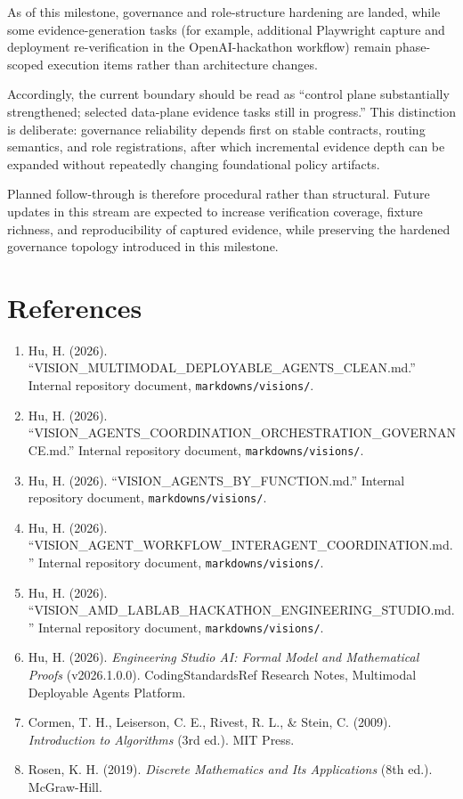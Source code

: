 \documentclass[12pt]{article}
\begin{document}
As of this milestone, governance and role-structure hardening are landed,
while some evidence-generation tasks (for example, additional Playwright
capture and deployment re-verification in the OpenAI-hackathon workflow)
remain phase-scoped execution items rather than architecture changes.

Accordingly, the current boundary should be read as ``control plane
substantially strengthened; selected data-plane evidence tasks still in
progress.'' This distinction is deliberate: governance reliability
depends first on stable contracts, routing semantics, and role
registrations, after which incremental evidence depth can be expanded
without repeatedly changing foundational policy artifacts.

Planned follow-through is therefore procedural rather than structural.
Future updates in this stream are expected to increase verification
coverage, fixture richness, and reproducibility of captured evidence,
while preserving the hardened governance topology introduced in this
milestone.

\newpage
\section*{References}
\label{sec:references}

\begin{sloppypar}
\begin{enumerate}
    \item Hu, H. (2026). ``VISION\_MULTIMODAL\_\allowbreak DEPLOYABLE\_AGENTS\_CLEAN.md.''
          Internal repository document, \texttt{markdowns/visions/}.
    \item Hu, H. (2026). ``VISION\_AGENTS\_COORDINATION\_\allowbreak ORCHESTRATION\_\allowbreak GOVERNANCE.md.'' Internal repository document,
          \texttt{markdowns/visions/}.
    \item Hu, H. (2026). ``VISION\_AGENTS\_BY\_FUNCTION.md.'' Internal
          repository document, \texttt{markdowns/visions/}.
    \item Hu, H. (2026). ``VISION\_AGENT\_WORKFLOW\_INTERAGENT\_\allowbreak COORDINATION.md.'' Internal repository document,
          \texttt{markdowns/visions/}.
    \item Hu, H. (2026). ``VISION\_AMD\_LABLAB\_HACKATHON\_ENGINEERING\_\allowbreak STUDIO.md.'' Internal repository document,
          \texttt{markdowns/visions/}.
    \item Hu, H. (2026). \textit{Engineering Studio AI: Formal Model and
          Mathematical Proofs} (v2026.1.0.0). CodingStandardsRef Research
          Notes, Multimodal Deployable Agents Platform.
    \item Cormen, T. H., Leiserson, C. E., Rivest, R. L., \& Stein, C.
          (2009). \textit{Introduction to Algorithms} (3rd ed.). MIT Press.
    \item Rosen, K. H. (2019). \textit{Discrete Mathematics and Its
          Applications} (8th ed.). McGraw-Hill.
\end{enumerate}
\end{sloppypar}
\end{document}
